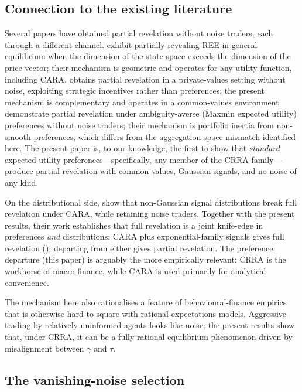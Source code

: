 \documentclass[12pt,letterpaper]{article}
\theoremstyle{definition}
\theoremstyle{remark}
\newcommand{\1}{\mathbf{1}}
\begin{document}
\subsection{Connection to the existing literature}

Several papers have obtained partial revelation without noise traders,
each through a different channel. \citet{HeifetzPolemarchakis1998} exhibit
partially-revealing REE in general equilibrium when the dimension of
the state space exceeds the dimension of the price vector; their mechanism
is geometric and operates for any utility function, including CARA.
\citet{Vives2011} obtains partial revelation in a private-values setting
without noise, exploiting strategic incentives rather than preferences;
the present mechanism is complementary and operates in a common-values
environment. \citet{CondieGanguli2011} demonstrate partial revelation
under ambiguity-averse (Maxmin expected utility) preferences without
noise traders; their mechanism is portfolio inertia from non-smooth
preferences, which differs from the aggregation-space mismatch identified
here. The present paper is, to our knowledge, the first to show that
\emph{standard} expected utility preferences---specifically, any member
of the CRRA family---produce partial revelation with common values,
Gaussian signals, and no noise of any kind.

On the distributional side, \citet{AlbagliHellwigTsyvinski2024} show
that non-Gaussian signal distributions break full revelation under CARA,
while retaining noise traders. Together with the present results, their
work establishes that full revelation is a joint knife-edge in preferences
\emph{and} distributions: CARA plus exponential-family signals gives full
revelation (\citealt{BreonDrish2015}); departing from either gives partial
revelation. The preference departure (this paper) is arguably the more
empirically relevant: CRRA is the workhorse of macro-finance, while CARA
is used primarily for analytical convenience.

The mechanism here also rationalises a feature of behavioural-finance
empirics that is otherwise hard to square with rational-expectations
models. Aggressive trading by relatively uninformed agents looks like
noise; the present results show that, under CRRA, it can be a fully
rational equilibrium phenomenon driven by misalignment between $\gamma$
and $\tau$.

\subsection{The vanishing-noise selection}\label{sec:vanishing-noise}
\end{document}
